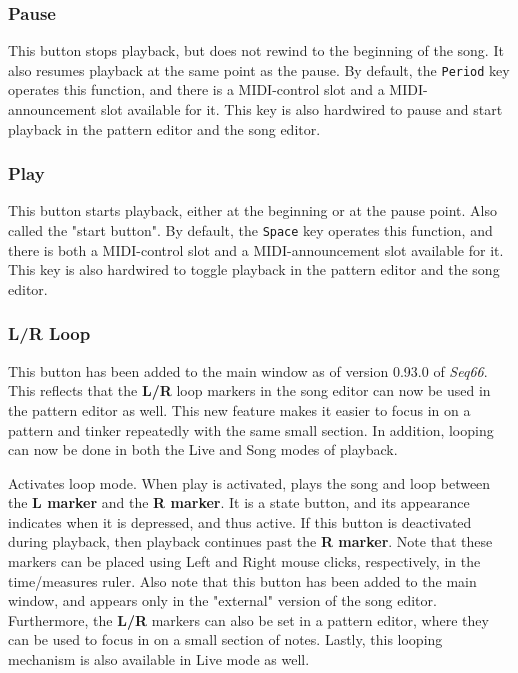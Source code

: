 \subsubsection{Pause}
\label{subsubsec:introduction_pause_button}

   This button stops playback, but does not rewind to the beginning of the
   song.  It also resumes playback at the same point as the pause.  By default,
   the \texttt{Period} key operates this function, and there is a MIDI-control
   slot and a MIDI-announcement slot available for it.  This key is also
   hardwired to pause and start playback in the pattern editor and the song
   editor.

\subsubsection{Play}
\label{subsubsec:introduction_play_button}

   This button starts playback, either at the beginning or at the pause point.
   Also called the "start button".
   By default, the \texttt{Space} key operates this function,
   and there is both a MIDI-control slot and a MIDI-announcement slot
   available for it.
   This key is also hardwired to toggle playback in the pattern editor and the
   song editor.

\subsubsection{L/R Loop}
\label{subsubsec:introduction_loop_button}

   This button has been added to the main window as of version 0.93.0 of
   \textsl{Seq66}.
   This reflects that the \textbf{L/R} loop markers in the song editor can now
   be used in the pattern editor as well.  This new feature makes it easier to
   focus in on a pattern and tinker repeatedly with the same small section.
   In addition, looping can now be done in both the Live and Song modes of
   playback.

   Activates loop mode. When play is activated, plays the song and loop
   between the
   \textbf{L marker} and the \textbf{R marker}.
   It is a state button, and its appearance indicates when it is
   depressed, and thus active.
   If this button is deactivated during playback, then playback
   continues past the \textbf{R marker}.
   Note that these markers can be placed using Left
   and Right mouse clicks, respectively, in the time/measures ruler.
   Also note that this button has been added to the main
   window, and appears only in the "external" version of the song editor.
   Furthermore, the \textbf{L/R} markers can also be set in a pattern editor,
   where they can be used to focus in on a small section of notes.
   Lastly, this looping mechanism is also available in Live mode as well.

